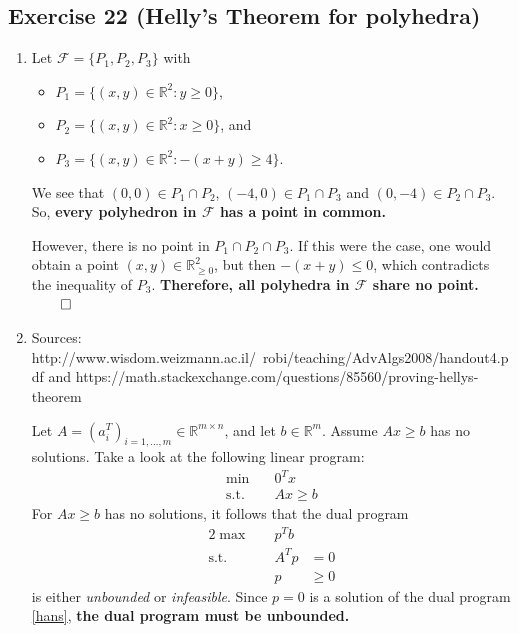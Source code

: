 \documentclass[9pt]{extarticle}
\begin{document}
\subsection*{Exercise 22 (Helly’s Theorem for polyhedra)}
\begin{enumerate}[label=(\roman*)]
    \item Let $\mathcal F = \{ P_1, P_2, P_3 \}$ with 
    \begin{itemize}
        \item $P_1 = \{ (x,y) \in \mathbb R^2 : y \geq 0 \}$,
        \item $P_2 = \{ (x,y) \in \mathbb R^2 : x \geq 0 \}$, and
        \item $P_3 = \{ (x,y) \in \mathbb R^2 : -(x+y) \geq 4 \}$.
    \end{itemize}
    
    We see that $(0,0) \in P_1 \cap P_2$, $(-4,0) \in P_1 \cap P_3$ and $(0,-4) \in P_2 \cap P_3$. So, \textbf{every polyhedron in $\mathcal F$ has a point in common.}
    
    However, there is no point in $P_1 \cap P_2 \cap P_3$. If this were the case, one would obtain a point $(x,y) \in \mathbb R^2_{\geq 0}$, but then $-(x+y) \leq 0$, which contradicts the inequality of $P_3$. \textbf{Therefore, all polyhedra in $\mathcal F$ share no point.} $\qed$

    \item Sources: http://www.wisdom.weizmann.ac.il/~robi/teaching/AdvAlgs2008/handout4.pdf and https://math.stackexchange.com/questions/85560/proving-hellys-theorem
    
    Let $A = (a_i^T)_{i=1,...,m} \in \mathbb R^{m \times n}$, and let $b \in \mathbb R^m$. Assume $Ax \geq b$ has no solutions. Take a look at the following linear program:
    \begin{align}\label{papa}
        \min \quad &0^Tx \\
        \text{s.t.} \quad &Ax \geq b \nonumber
    \end{align}
    For $Ax \geq b$ has no solutions, it follows that the dual program
    \begin{alignat}{2}\label{hans}
        \max \quad &p^Tb&  \\
        \text{s.t.} \quad & A^Tp &= 0 \nonumber \\
        & p &\geq 0 \nonumber 
    \end{alignat}
    is either \emph{unbounded} or \emph{infeasible}. Since $p=0$ is a solution of the dual program \eqref{hans}, \textbf{the dual program must be unbounded.}


\end{enumerate}
\end{document}
